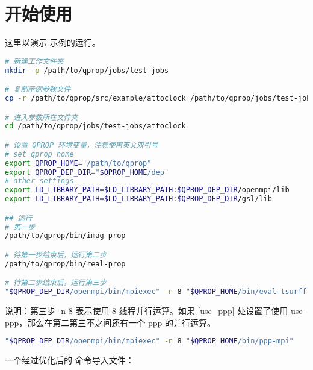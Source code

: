 \section{开始使用}

这里以演示  示例的运行。

\begin{lstlisting}[language=bash]
# 新建工作文件夹
mkdir -p /path/to/qprop/jobs/test-jobs

# 复制示例参数文件
cp -r /path/to/qprop/src/example/attoclock /path/to/qprop/jobs/test-jobs

# 进入参数所在文件夹
cd /path/to/qprop/jobs/test-jobs/attoclock

# 设置 QPROP 环境变量，注意使用英文双引号
# set qprop home
export QPROP_HOME="/path/to/qprop"
export QPROP_DEP_DIR="$QPROP_HOME/dep"
# other settings
export LD_LIBRARY_PATH=$LD_LIBRARY_PATH:$QPROP_DEP_DIR/openmpi/lib
export LD_LIBRARY_PATH=$LD_LIBRARY_PATH:$QPROP_DEP_DIR/gsl/lib

## 运行
# 第一步
/path/to/qprop/bin/imag-prop

# 待第一步结束后，运行第二步
/path/to/qprop/bin/real-prop

# 待第二步结束后，运行第三步
"$QPROP_DEP_DIR/openmpi/bin/mpiexec" -n 8 "$QPROP_HOME/bin/eval-tsurff-mpi"
\end{lstlisting}

说明：第三步 -n 8 表示使用 8 线程并行运算。如果 \ref{use_ppp} 处设置了使用 use-ppp，那么在第二第三不之间还有一个 ppp 的并行运算。

\begin{lstlisting}[language=bash]
"$QPROP_DEP_DIR/openmpi/bin/mpiexec" -n 8 "$QPROP_HOME/bin/ppp-mpi"
\end{lstlisting}

\newpage
一个经过优化后的 命令导入文件：


